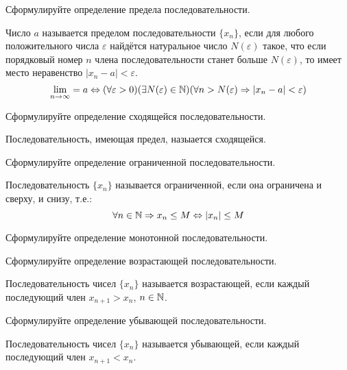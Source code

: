 \begin{question}
  Сформулируйте определение предела последовательности.
\end{question}
\begin{answer}
 Число $a$ называется пределом последовательности $\{x_{n}\}$, если для любого положительного числа $\varepsilon$ найдётся натуральное число $N(\varepsilon)$ такое, что если порядковый номер $n$ члена последовательности станет больше $N(\varepsilon)$, то имеет место неравенство $|x_{n} - a| < \varepsilon$.\[
 \lim_{n \to \infty} = a \iff (\forall \varepsilon > 0)(\exists N(\varepsilon) \in \N)(\forall  n > N(\varepsilon) \implies |x_{n} - a| < \varepsilon) 
 \] 
\end{answer}

\begin{question}
  Сформулируйте определение сходящейся последовательности.
\end{question}
\begin{answer}
  Последовательность, имеющая предел, назыается сходящейся.
\end{answer}

\begin{question}
  Сформулируйте определение ограниченной последовательности.
\end{question}
\begin{answer}
  Последовательность $\{x_{n}\}$ называется ограниченной, если она ограничена и сверху, и снизу, т.е.: \[
  \forall n \in \mathbb{N} \Rightarrow x_{n} \le M \Leftrightarrow |x_{n}| \le M
  \] 
\end{answer}

\begin{question}
  Сформулируйте определение монотонной последовательности.
\end{question}

\begin{question}
  Сформулируйте определение возрастающей последовательности.
\end{question}
\begin{answer}
  Последовательность чисел $\{x_n\}$ называется возрастающей, если каждый последующий член $x_{n+1} > x_{n}$, $n \in \mathbb{N}$.
\end{answer}

\begin{question}
  Сформулируйте определение убывающей последовательности.
\end{question}
\begin{answer}
  Последовательность чисел $\{x_{n}\}$ называется убывающей, если каждый последующий член $x_{n+1} < x_{n}$.
\end{answer}


